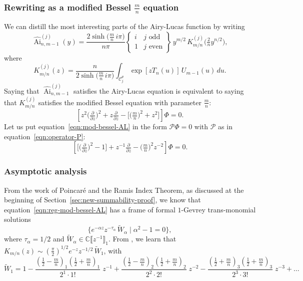 \documentclass{article}
\newcommand{\C}{\mathbb{C}}
\newcommand{\series}[1]{\tilde{#1}}
\DeclareMathOperator{\Ai}{Ai}
\theoremstyle{definition}
\theoremstyle{plain}
\begin{document}
\subsubsection{Rewriting as a modified Bessel $\frac{m}{n}$ equation}
We can distill the most interesting parts of the Airy-Lucas function by writing
\[ \widehat{\Ai}^{(j)}_{n, m-1}(y) = \frac{2 \sinh\big(\tfrac{m}{n}\,i\pi\big)}{n\pi} \left\{\begin{array}{ll}i & j \text{ odd} \\ 1 & j \text{ even}\end{array}\right\}\,y^{{m/2}}\,K^{(j)}_{m/n}\big(\tfrac{2}{n} y^{n/2}\big), \]
where
\begin{equation}\label{integral:mod-bessel-rational-AL}
K^{(j)}_{m/n}(z) = \frac{n}{2 \sinh\big(\tfrac{m}{n}\,i\pi\big)}\int_{\mathcal{C}^\theta_j} \exp\left[z T_n(u)\right]\,U_{m-1}(u)\,du.
\end{equation}
Saying that $\widehat{\Ai}^{(j)}_{n, m-1}$ satisfies the Airy-Lucas equation is equivalent to saying that $K^{(j)}_{m/n}$ satisfies the modified Bessel equation with parameter $\frac{m}{n}$:
\begin{equation}\label{eqn:mod-bessel-AL}
\left[z^2 \big(\tfrac{\partial}{\partial z}\big)^2 + z \tfrac{\partial}{\partial z} - \big[\big(\tfrac{m}{n} \big)^2 + z^2\big]\right] \Phi = 0.
\end{equation}
Let us put equation~\eqref{eqn:mod-bessel-AL} in the form $\mathcal{P}\Phi=0$ with $\mathcal{P}$ as in equation~\eqref{eqn:operator-P}:
\begin{equation}\label{eqn:reg-mod-bessel-AL}
\left[ \big[ \big(\tfrac{\partial}{\partial z}\big)^2 - 1 \big] + z^{-1} \tfrac{\partial}{\partial z} - \big({\tfrac{m}{n}}\big)^2 z^{-2} \right] \Phi = 0.
\end{equation}

\subsubsection{Asymptotic analysis}\label{sec:asympt-AL}
From the work of Poincar\'{e} and the Ramis Index Theorem, as discussed at the beginning of Section~\ref{sec:new-summability-proof}, we know that equation~\eqref{eqn:reg-mod-bessel-AL} has a frame of formal $1$-Gevrey trans-monomial solutions
\[ \{ e^{-\alpha z} z^{-\tau_\alpha}\,\series{W}_\alpha \mid \alpha^2 - 1 = 0 \}, \]
where $\tau_\alpha = 1/2$ and $\series{W}_\alpha\in\C\llbracket z^{-1} \rrbracket_1$. From \cite[Equations 10.40.2 and 10.17.1]{dlmf}, we learn that $K_{m/n}(z) \sim \left(\tfrac{\pi}{2}\right)^{1/2} e^{-z} z^{-1/2}\,\series{W}_1$, with
\begin{equation}\label{bessel-asymp-AL}
\series{W}_1 = 1 - \frac{\left(\tfrac{1}{2}-\tfrac{m}{n}\right)_1 \left(\tfrac{1}{2}+\frac{m}{n}\right)_1}{2^1 \cdot 1!}\;z^{-1} + \frac{\left(\tfrac{1}{2}-\tfrac{m}{n}\right)_2 \left(\tfrac{1}{2}+\tfrac{m}{n}\right)_2}{2^2 \cdot 2!}\;z^{-2} - \frac{\left(\tfrac{1}{2}+\tfrac{m}{n}\right)_3 \left(\tfrac{1}{2}+\tfrac{m}{n}\right)_3}{2^3 \cdot 3!}\;z^{-3} + \ldots
\end{equation}
\end{document}
